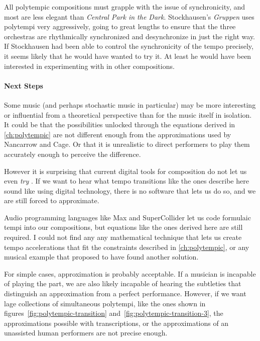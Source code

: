 All polytempic compositions must grapple with the issue of
synchronicity, and most are less elegant than \textit{Central Park in
  the Dark}. Stockhausen's \textit{Gruppen} uses polytempi very
aggressively, going to great lengths to ensure that the three
orchestras are rhythmically synchronized and desynchronize in just the
right way.  If Stockhausen had been able to control the synchronicity
of the tempo precisely, it seems likely that he would have wanted
to try it. At least he would have been interested in experimenting with
\polytempic in other compositions.

\paragraph{Next Steps} Some music (and perhaps stochastic music in
particular) may be more interesting or influential from a theoretical
perspective than for the music itself in isolation. It could be that
the possibilities unlocked through the equations derived in
\autoref{ch:polytempic} are not different enough from the
approximations used by Nancarrow and Cage. Or that it is unrealistic
to direct performers to play them accurately enough to perceive the
difference.

However it is surprising that current digital tools for composition do
not let us even \emph{try} \polytempic. If we want to hear what tempo
transitions like the ones describe here sound like using digital
technology, there is no software that lets us do so, and we are still
forced to approximate. 

Audio programming languages like Max and SuperCollider let us code
formulaic tempi into our compositions, but equations like the ones
derived here are still required. I could not find any any mathematical
technique that lets us create tempo accelerations that fit the
constraints described in \autoref{ch:polytempic}, or any musical
example that proposed to have found another solution.

For simple cases, approximation is probably acceptable. If a musician
is incapable of playing the part, we are also likely incapable of
hearing the subtleties that distinguish an approximation from a
perfect performance. However, if we want lage collections of
simultaneous polytempi, like the ones shown in
figures~\ref{fig:polytempic-transition}
and~\ref{fig:polytempic-transition-3}, the approximations possible
with transcriptions, or the approximations of an unassisted human
performers are not precise enough.

